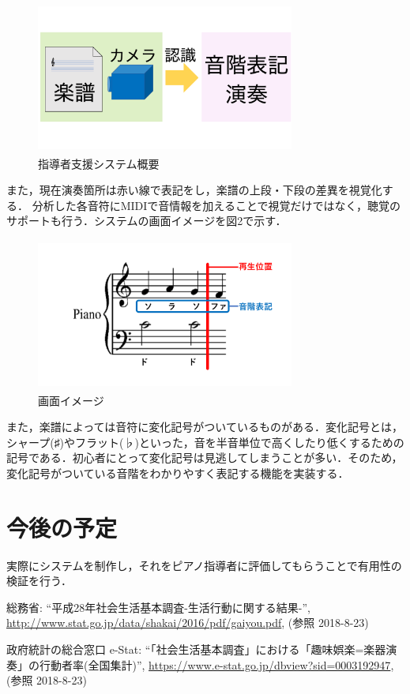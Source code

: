 \documentclass[twocolumn,10pt,a4j]{jsarticle}
\begin{document}
\begin{figure}[h]
\begin{center}
 \includegraphics[clip,width=85mm,height=50mm]{image1.pdf}
\end{center}
 \caption{指導者支援システム概要}
 \label{fig:教科書}
\end{figure}

また，現在演奏箇所は赤い線で表記をし，楽譜の上段・下段の差異を視覚化する．
分析した各音符にMIDIで音情報を加えることで視覚だけではなく，聴覚のサポートも行う．システムの画面イメージを図2で示す．

\begin{figure}[h]
\begin{center}
 \includegraphics[clip,width=85mm,height=50mm]{image2.pdf}
\end{center}
 \caption{画面イメージ}
 \label{fig:教科書}
\end{figure}

また，楽譜によっては音符に変化記号がついているものがある．変化記号とは，シャープ(♯)やフラット(♭)といった，音を半音単位で高くしたり低くするための記号である．初心者にとって変化記号は見逃してしまうことが多い．そのため，変化記号がついている音階をわかりやすく表記する機能を実装する．

\section{今後の予定}
実際にシステムを制作し，それをピアノ指導者に評価してもらうことで有用性の検証を行う．

\begin{thebibliography}{99}
 総務省: ``平成28年社会生活基本調査-生活行動に関する結果-'', \url{http://www.stat.go.jp/data/shakai/2016/pdf/gaiyou.pdf}, (参照 2018-8-23)

 政府統計の総合窓口 e-Stat: ``「社会生活基本調査」における「趣味娯楽=楽器演奏」の行動者率(全国集計)'', \url{https://www.e-stat.go.jp/dbview?sid=0003192947}, (参照 2018-8-23)

\end{thebibliography}
\end{document}
